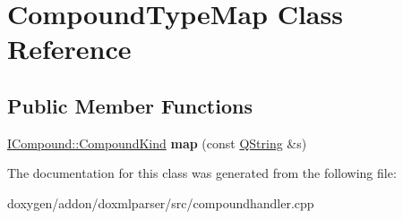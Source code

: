 \hypertarget{class_compound_type_map}{}\section{Compound\+Type\+Map Class Reference}
\label{class_compound_type_map}
\subsection*{Public Member Functions}
\begin{DoxyCompactItemize}
\item 
\mbox{\label{class_compound_type_map_a514546430c13906a3ab6c022c911a129}} 
\mbox{\hyperlink{class_i_compound_a6b86be2ca9f6759434c1dd8405be328a}{I\+Compound\+::\+Compound\+Kind}} {\bfseries map} (const \mbox{\hyperlink{class_q_string}{Q\+String}} \&s)
\end{DoxyCompactItemize}


The documentation for this class was generated from the following file\+:\begin{DoxyCompactItemize}
\item 
doxygen/addon/doxmlparser/src/compoundhandler.\+cpp\end{DoxyCompactItemize}

